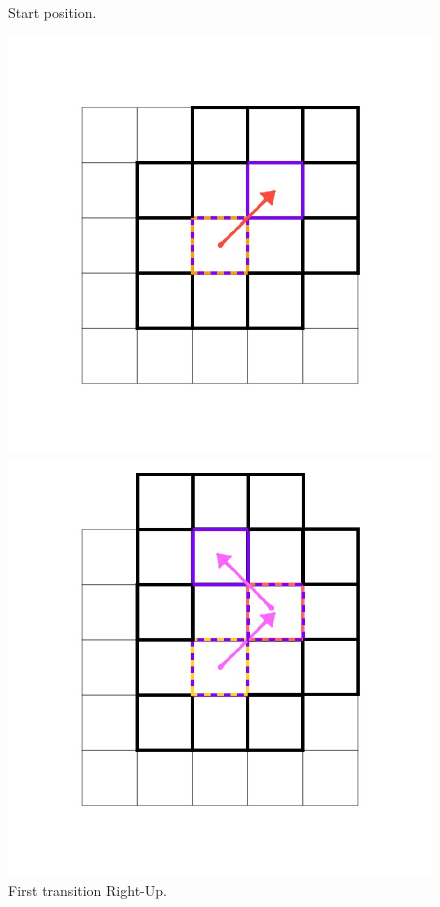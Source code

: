 \documentclass[class=article, crop=false]{standalone}
\begin{document}
\begin{figure}[ht]
\begin{minipage}[c]{0.33\linewidth}
\captionsetup{width=.8\linewidth}
\caption{Start position.}
\label{fig:Thesis_D2Q9andQ9.005}
\end{minipage}
\begin{minipage}[c]{0.33\linewidth}
\centering

\includegraphics[scale=0.17]{draw/Thesis_plots/Thesis_D2Q9andQ9_crop/Thesis_D2Q9andQ9.006}

\captionsetup{width=.8\linewidth}
\caption{First transition Right-Up.}
\label{fig:Thesis_D2Q9andQ9.006}
\end{minipage}
\begin{minipage}[c]{0.33\linewidth}
\centering

\includegraphics[scale=0.17]{draw/Thesis_plots/Thesis_D2Q9andQ9_crop/Thesis_D2Q9andQ9.007}


\end{minipage}
\end{figure}
\end{document}
